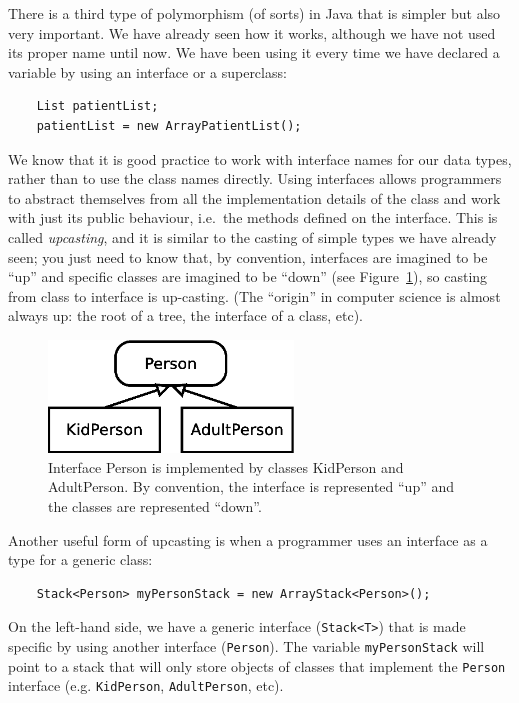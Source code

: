 There is a third type of
polymorphism (of sorts) in Java that is simpler but also very
important. 
We have
already seen how it works, although we have not used its proper name
until now.
We have been using it every time we have declared
a variable by using an interface or a superclass: 

\begin{verbatim}
    List patientList;
    patientList = new ArrayPatientList();
\end{verbatim}

We know that it is good practice to work with interface names for our
data types, rather than to use the class names directly. Using interfaces
allows programmers to abstract themselves from all the implementation details
of the class and work with just its public behaviour, i.e.~the methods
defined on the interface. This is called \emph{upcasting}, and it is similar to the
casting of simple types we have already seen; you just need to know
that, by convention, interfaces are imagined to be ``up'' and specific
classes are imagined to be ``down'' (see Figure~\ref{fig:updown}), so casting from class to
interface is up-casting. (The ``origin'' in computer science is almost
always up: the root of a tree, the interface of a class, etc). 

\begin{figure}[hbtp]
  \centering
  \includegraphics[height=3cm]{gfx/class_diagram-person}
  \caption{Interface Person is implemented by classes KidPerson and
    AdultPerson. By convention, the interface is represented ``up'' and
    the classes are represented ``down''.} 
  \label{fig:updown}
\end{figure}

Another useful form of upcasting is when a programmer uses an
interface as a type for a generic class: 

\begin{verbatim}
    Stack<Person> myPersonStack = new ArrayStack<Person>();
\end{verbatim}

On the left-hand side, we have a generic interface (\verb+Stack<T>+) that is made
specific by using another interface (\verb+Person+). The variable
\verb+myPersonStack+ will point to a stack that will only store
objects of classes that implement the \verb+Person+ interface
(e.g. \verb+KidPerson+, \verb+AdultPerson+, etc). 

